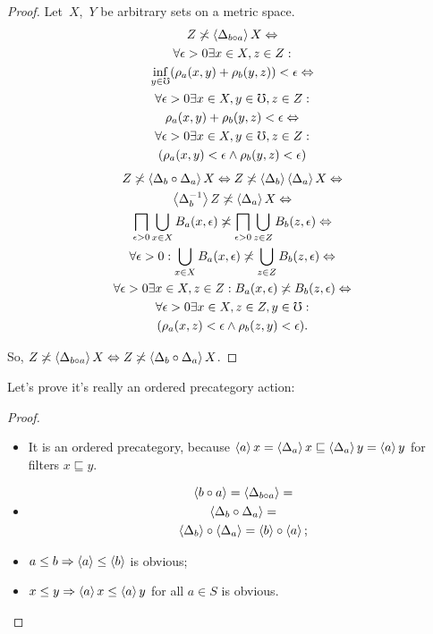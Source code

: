 \begin{proof}
Let~$X$,~$Y$ be arbitrary sets on a metric space.
\begin{multline*}
Z\not\asymp\left\langle \Delta_{b\circ a}\right\rangle X \Leftrightarrow \\
\forall\epsilon>0\exists x\in X,z\in Z:\\\inf_{y\in\mho}(\rho_a(x,y)+\rho_b(y,z))<\epsilon \Leftrightarrow \\
\forall\epsilon>0\exists x\in X,y\in\mho,z\in Z:\\\rho_a(x,y)+\rho_b(y,z)<\epsilon \Leftrightarrow \\
\forall\epsilon>0\exists x\in X,y\in\mho,z\in Z:\\(\rho_a(x,y)<\epsilon\land\rho_b(y,z)<\epsilon)
\end{multline*}
\begin{multline*}
Z\not\asymp\left\langle \Delta_b\circ\Delta_a\right\rangle X \Leftrightarrow
Z\not\asymp\left\langle \Delta_b\right\rangle\left\langle \Delta_a\right\rangle X\Leftrightarrow\\
\left\langle \Delta_b^{-1}\right\rangle Z\not\asymp\left\langle \Delta_a\right\rangle X \Leftrightarrow\\
\bigsqcap_{\epsilon>0}\bigcup_{x\in X}B_a(x,\epsilon) \not\asymp\bigsqcap_{\epsilon>0}\bigcup_{z\in Z}B_b(z,\epsilon) \Leftrightarrow \\
\forall\epsilon>0:\bigcup_{x\in X}B_a(x,\epsilon) \not\asymp\bigcup_{z\in Z}B_b(z,\epsilon) \Leftrightarrow \\
\forall\epsilon>0\exists x\in X,z\in Z:B_a(x,\epsilon)\not\asymp B_b(z,\epsilon) \Leftrightarrow \\
\forall\epsilon>0\exists x\in X,z\in Z,y\in\mho:\\(\rho_a(x,z)<\epsilon\land\rho_b(z,y)<\epsilon).
\end{multline*}

So, $Z\not\asymp\left\langle \Delta_{b\circ a}\right\rangle X \Leftrightarrow Z\not\asymp\left\langle \Delta_b\circ\Delta_a\right\rangle X$.
\end{proof}

Let's prove it's really an ordered precategory action:

\begin{proof}
~
\begin{itemize}
\item It is an ordered precategory, because
$\left\langle a\right\rangle x = \left\langle \Delta_a\right\rangle x \sqsubseteq \left\langle \Delta_a\right\rangle y = \left\langle a\right\rangle y$ 
for filters $x\sqsubseteq y$.

\item
\begin{multline*}
\left\langle b\circ a\right\rangle = \left\langle \Delta_{b\circ a}\right\rangle = \\ \left\langle \Delta_b\circ\Delta_a\right\rangle = \\ \left\langle \Delta_b\right\rangle\circ\left\langle \Delta_a\right\rangle = \left\langle b\right\rangle\circ\left\langle a\right\rangle;
\end{multline*}
\item $a\leq b\Rightarrow \left\langle a\right\rangle\leq \left\langle b\right\rangle$ is obvious;
\item $x\leq y\Rightarrow\left\langle a\right\rangle x\leq \left\langle a\right\rangle y$ for all $a\in S$ is obvious.
\end{itemize}
\end{proof}

